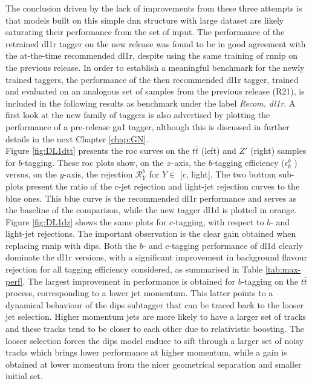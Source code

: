 The conclusion driven by the lack of improvements from these three attempts is that models built on this simple \gls{dnn} structure with large dataset are likely saturating their performance from the set of input. The performance of the retrained \gls{dl1r} tagger on the new release was found to be in good agreement with the at-the-time recommended \gls{dl1r}, despite using the same training of \gls{rnnip} on the previous release. In order to establish a meaningful benchmark for the newly trained taggers, the performance of the then recommended \gls{dl1r} tagger, trained and evaluated on an analogous set of samples from the previous release (R21), is included in the following results as benchmark under the label \textit{Recom. \gls{dl1r}}. A first look at the new family of taggers is also advertised by plotting the performance of a pre-release \gls{gn1} tagger, although this is discussed in further details in the next Chapter \ref{chap:GN}. \\

Figure \ref{fig:DL1dtt} presents the \gls{roc} curves on the $t\bar{t}$ (left) and $Z'$ (right) samples for  $b$-tagging. These \gls{roc} plots show, on the $x$-axis, the $b$-tagging efficiency ($\epsilon^b_b$ ) versus, on the $y$-axis, the rejection $\mathcal{R}^b_Y$ for $Y \in$ [$c$, light]. The two bottom sub-plots present the ratio of the c-jet rejection and light-jet rejection curves to the blue ones. This blue curve is the recommended \gls{dl1r} performance and serves as the baseline of the comparison, while the new tagger \gls{dl1d} is plotted in orange. Figure \ref{fig:DL1dz} shows the same plots for $c$-tagging, with respect to $b$- and light-jet rejections. The important observation is the clear gain obtained when replacing \gls{rnnip} with \gls{dips}. Both the $b$- and $c$-tagging performance of \gls{dl1d} clearly dominate the \gls{dl1r} versions, with a significant improvement in background flavour rejection for all tagging efficiency considered, as summarised in Table \ref{tab:max-perf}. The largest improvement in performance is obtained for $b$-tagging on the $t\bar{t}$ process, corresponding to a lower jet momentum. This latter points to a dynamical behaviour of the \gls{dips} subtagger that can be traced back to the looser jet selection. Higher momentum jets are more likely to have a larger set of tracks and these tracks tend to be closer to each other due to relativistic boosting. The looser selection forces the \gls{dips} model enduce to sift through a larger set of noisy tracks which brings lower performance at higher momentum, while a gain is obtained at lower momentum from the nicer geometrical separation and smaller initial set.  \\

